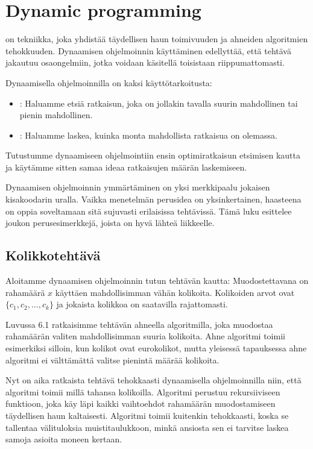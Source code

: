 \chapter{Dynamic programming}


on tekniikka, joka yhdistää täydellisen haun
toimivuuden ja ahneiden algoritmien tehokkuuden.
Dynaamisen ohjelmoinnin käyttäminen edellyttää,
että tehtävä jakautuu osaongelmiin,
jotka voidaan käsitellä toisistaan riippumattomasti.

Dynaamisella ohjelmoinnilla on kaksi käyttötarkoitusta:

\begin{itemize}
\item
{}:
Haluamme etsiä ratkaisun, joka on
jollakin tavalla suurin mahdollinen
tai pienin mahdollinen.
\item
{}:
Haluamme laskea, kuinka monta mahdollista
ratkaisua on olemassa.
\end{itemize}

Tutustumme dynaamiseen ohjelmointiin ensin
optimiratkaisun etsimisen kautta ja käytämme sitten
samaa ideaa ratkaisujen määrän laskemiseen.

Dynaamisen ohjelmoinnin ymmärtäminen on yksi merkkipaalu
jokaisen kisakoodarin uralla.
Vaikka menetelmän perusidea on yksinkertainen,
haasteena on oppia soveltamaan sitä sujuvasti
erilaisissa tehtävissä.
Tämä luku esittelee joukon
perusesimerkkejä, joista on hyvä lähteä liikkeelle.

\section{Kolikkotehtävä}

Aloitamme dynaamisen ohjelmoinnin tutun tehtävän kautta:
Muodostettavana on rahamäärä $x$
käyttäen mahdollisimman vähän kolikoita.
Kolikoiden arvot ovat $\{c_1,c_2,\ldots,c_k\}$
ja jokaista kolikkoa on saatavilla rajattomasti.

Luvussa 6.1 ratkaisimme tehtävän ahneella algoritmilla,
joka muodostaa rahamäärän valiten mahdollisimman
suuria kolikoita.
Ahne algoritmi toimii esimerkiksi silloin,
kun kolikot ovat eurokolikot,
mutta yleisessä tapauksessa ahne algoritmi
ei välttämättä valitse pienintä määrää kolikoita.

Nyt on aika ratkaista tehtävä tehokkaasti
dynaamisella ohjelmoinnilla niin,
että algoritmi toimii millä tahansa kolikoilla.
Algoritmi perustuu rekursiiviseen funktioon,
joka käy läpi kaikki vaihtoehdot rahamäärän
muodostamiseen täydellisen haun kaltaisesti.
Algoritmi toimii kuitenkin tehokkaasti, koska
se tallentaa välituloksia muistitaulukkoon,
minkä ansiosta sen ei tarvitse laskea samoja
asioita moneen kertaan.

